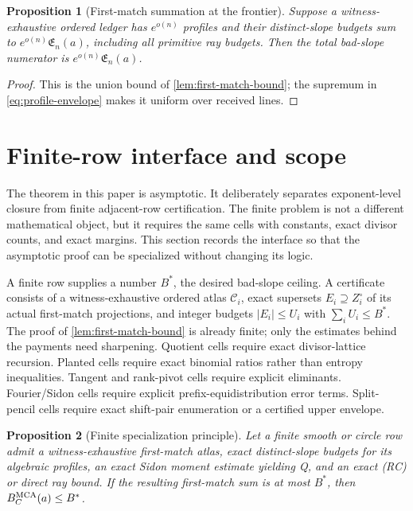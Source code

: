\documentclass[12pt,a4paper]{amsart}
\numberwithin{equation}{section}
\newtheorem{proposition}[proposition]{Proposition}
\theoremstyle{remark}
\newcommand{\Ccal}{\mathcal C}
\newcommand{\abs}[1]{\lvert #1\rvert}
\begin{document}
\begin{proposition}[First-match summation at the frontier]\label{prop:first-match-sum-detail}
Suppose a witness-exhaustive ordered ledger has \(e^{o(n)}\) profiles and their
distinct-slope budgets sum to \(e^{o(n)}\mathfrak E_n(a)\), including all
primitive ray budgets.  Then the total bad-slope numerator is
\(e^{o(n)}\mathfrak E_n(a)\).
\end{proposition}

\begin{proof}
This is the union bound of \cref{lem:first-match-bound}; the supremum in
\eqref{eq:profile-envelope} makes it uniform over received lines.
\end{proof}

\section{Finite-row interface and scope}\label{sec:finite-interface}

The theorem in this paper is asymptotic.  It deliberately separates exponent-level closure from finite adjacent-row certification.  The finite problem is not a different mathematical object, but it requires the same cells with constants, exact divisor counts, and exact margins.  This section records the interface so that the asymptotic proof can be specialized without changing its logic.

A finite row supplies a number \(B^*\), the desired bad-slope ceiling.  A
certificate consists of a witness-exhaustive ordered atlas
\(\Ccal_i\), exact supersets \(E_i\supseteq Z_i^\circ\) of its actual
first-match projections, and integer budgets \(\abs{E_i}\le U_i\) with
\(\sum_iU_i\le B^*\).  The proof of \cref{lem:first-match-bound} is already
finite; only the estimates behind the payments need sharpening.  Quotient
cells require exact divisor-lattice recursion.  Planted cells require exact
binomial ratios rather than entropy inequalities.  Tangent and rank-pivot
cells require explicit eliminants.  Fourier/Sidon cells require explicit
prefix-equidistribution error terms.  Split-pencil cells require exact
shift-pair enumeration or a certified upper envelope.

\begin{proposition}[Finite specialization principle]\label{prop:finite-specialization-principle}
Let a finite smooth or circle row admit a witness-exhaustive first-match atlas,
exact distinct-slope budgets for its algebraic profiles, an exact Sidon
moment estimate yielding Q, and an exact \textup{(RC)} or direct ray bound.
If the resulting first-match sum is at most \(B^*\), then
\(B_C^{\rm MCA}(a)\le B^*\).
\end{proposition}
\end{document}
